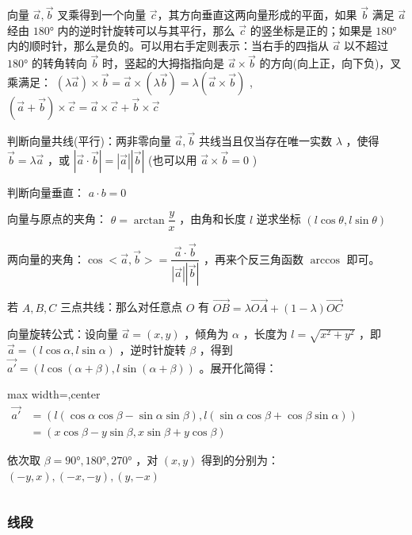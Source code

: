 \documentclass[twocolumn,10pt]{ctexart}
\begin{document}
向量 $\vec a,\vec b$ 叉乘得到一个向量 $\vec c$，其方向垂直这两向量形成的平面，如果 $\vec b$ 满足 $\vec a$ 经由 $180°$ 内的逆时针旋转可以与其平行，那么 $\vec c$ 的竖坐标是正的；如果是 $180°$ 内的顺时针，那么是负的。可以用右手定则表示：当右手的四指从 $\vec a$ 以不超过 $180°$ 的转角转向 $\vec b$ 时，竖起的大拇指指向是 $\vec a\times \vec b$ 的方向(向上正，向下负)，叉乘满足： $(\lambda \vec a)\times \vec b=\vec a \times(\lambda\vec b)=\lambda (\vec a\times \vec b)$ ,  $(\vec a+\vec b)\times\vec c=\vec a\times\vec c+\vec b\times \vec c$

判断向量共线(平行)：两非零向量 $\vec a,\vec b$ 共线当且仅当存在唯一实数 $\lambda$ ，使得 $\vec b=\lambda \vec a$ ，或 $|\vec{a}\cdot \vec{b}|=|\vec a||\vec b|$ (也可以用 $\vec a\times \vec b=0$ )

判断向量垂直： $a\cdot b=0$

向量与原点的夹角： $\theta=\arctan\dfrac{y}{x}$ ，由角和长度 $l$ 逆求坐标 $(l\cos\theta,l\sin\theta)$

两向量的夹角：$\cos<\vec a,\allowbreak{}\vec b>=\dfrac{\vec a\cdot\vec b}{|\vec a||\vec b|}$ ，再来个反三角函数  $\arccos$ 即可。

\begin{notebox}
若 $A,B,C$ 三点共线：那么对任意点 $O$ 有 $\vec{OB}=\lambda \vec{OA}+(1-\lambda)\vec{OC}$
\end{notebox}

向量旋转公式：设向量 $\vec a=(x,y)$ ，倾角为 $\alpha$ ，长度为 $l=\sqrt{x^2+y^2}$ ，即 $\vec a=(l\cos\alpha,\allowbreak{}l\sin\alpha)$ ，逆时针旋转 $\beta$ ，得到 $\vec{a'}=(l\cos(\alpha+\beta),\allowbreak{}l\sin(\alpha+\beta))$ 。展开化简得：

\begin{adjustbox}{max width=\linewidth,center}
$\begin{aligned}
\vec{a'}&=(l(\cos\alpha\cos\beta-\sin\alpha\sin\beta),l(\sin\alpha\cos\beta+\cos\beta\sin\alpha))\\
&=(x\cos\beta-y\sin\beta,x\sin\beta+y\cos\beta)
\end{aligned}$
\end{adjustbox}

依次取 $\beta=90°,180°,270°$ ，对 $(x,y)$ 得到的分别为： $(-y,x),(-x,-y),(y,-x)$

\inputminted{cpp}{code/ext_011.cpp}

\subsubsection{线段}
\end{document}

